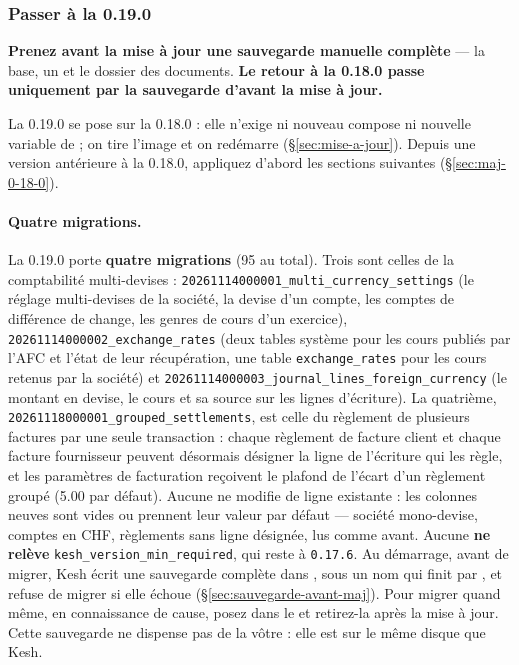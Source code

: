 \documentclass[a4paper,11pt,oneside]{article}
\begin{document}
\fussy

\subsubsection{Passer à la 0.19.0}\label{sec:maj-0-19-0}
\sloppy

\textbf{Prenez avant la mise à jour une sauvegarde manuelle complète} --- la base, un  et le dossier des documents. \textbf{Le retour à la 0.18.0 passe uniquement par la sauvegarde d'avant la mise à jour.}

La 0.19.0 se pose sur la 0.18.0 : elle n'exige ni nouveau compose ni nouvelle variable de  ; on tire l'image et on redémarre (\S\ref{sec:mise-a-jour}). Depuis une version antérieure à la 0.18.0, appliquez d'abord les sections suivantes (\S\ref{sec:maj-0-18-0}).

\paragraph{Quatre migrations.} La 0.19.0 porte \textbf{quatre migrations} (95 au total). Trois sont celles de la comptabilité multi-devises : \texttt{20261114000001\_multi\allowbreak\_currency\allowbreak\_settings} (le réglage multi-devises de la société, la devise d'un compte, les comptes de différence de change, les genres de cours d'un exercice), \texttt{20261114000002\_exchange\allowbreak\_rates} (deux tables système pour les cours publiés par l'AFC et l'état de leur récupération, une table \texttt{exchange\_rates} pour les cours retenus par la société) et \texttt{20261114000003\_journal\allowbreak\_lines\allowbreak\_foreign\allowbreak\_currency} (le montant en devise, le cours et sa source sur les lignes d'écriture). La quatrième, \texttt{20261118000001\_grouped\allowbreak\_settlements}, est celle du règlement de plusieurs factures par une seule transaction : chaque règlement de facture client et chaque facture fournisseur peuvent désormais désigner la ligne de l'écriture qui les règle, et les paramètres de facturation reçoivent le plafond de l'écart d'un règlement groupé (5.00 par défaut). Aucune ne modifie de ligne existante : les colonnes neuves sont vides ou prennent leur valeur par défaut --- société mono-devise, comptes en CHF, règlements sans ligne désignée, lus comme avant. Aucune \textbf{ne relève} \texttt{kesh\_version\_min\_required}, qui reste à \texttt{0.17.6}. Au démarrage, avant de migrer, Kesh écrit une sauvegarde complète dans , sous un nom qui finit par , et refuse de migrer si elle échoue (\S\ref{sec:sauvegarde-avant-maj}). Pour migrer quand même, en connaissance de cause, posez  dans le  et retirez-la après la mise à jour. Cette sauvegarde ne dispense pas de la vôtre : elle est sur le même disque que Kesh.
\end{document}
